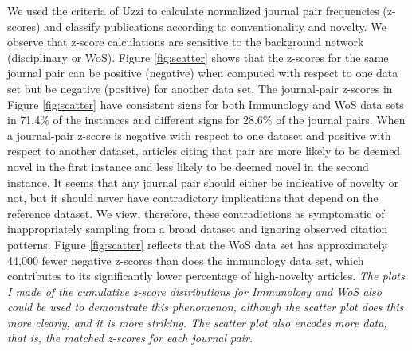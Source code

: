 \documentclass[NETN]{stjour}
\begin{document}
We used the criteria of Uzzi to calculate normalized journal pair frequencies (z-scores) and classify publications according to conventionality and novelty. We observe that z-score calculations are sensitive to the background network (disciplinary or WoS). Figure \ref{fig:scatter} shows that the z-scores for the same journal pair can be positive (negative) when computed with respect to one data set but be negative (positive) for another data set. The journal-pair z-scores in Figure \ref{fig:scatter} have consistent signs for both Immunology and WoS data sets in 71.4\% of the instances and different signs for 28.6\% of the journal pairs. When a journal-pair z-score is negative with respect to one dataset and positive with respect to another dataset, articles citing that pair are more likely to be deemed novel in the first instance and less likely to be deemed novel in the second instance.  It seems that any journal pair should either be indicative of novelty or not, but it should never have contradictory implications that depend on the reference dataset. We view, therefore, these contradictions as symptomatic of inappropriately sampling from a broad dataset and ignoring observed citation patterns.  Figure \ref{fig:scatter} reflects that the WoS data set has approximately 44,000 fewer negative z-scores than does the immunology data set, which contributes to its significantly lower percentage of high-novelty articles.  \emph{The plots I made of the cumulative z-score distributions for Immunology and WoS also could be used to demonstrate this phenomenon, although the scatter plot does this more clearly, and it is more striking.  The scatter plot also encodes more data, that is, the matched z-scores for each journal pair.}
\end{document}

